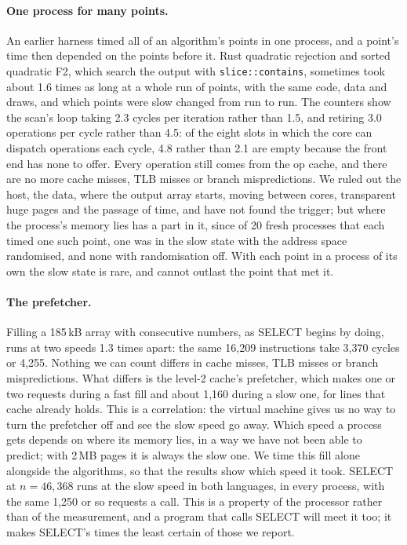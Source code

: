 \documentclass[letterpaper,11pt]{article}
\begin{document}
\paragraph{One process for many points.} An earlier harness timed all
of an algorithm's points in one process, and a point's time then
depended on the points before it. Rust quadratic rejection and sorted
quadratic F2, which search the output with
\texttt{slice::contains}, sometimes took about 1.6 times as
long at a whole run of points, with the same code, data and draws, and
which points were slow changed from run to run. The counters show the
scan's loop taking 2.3 cycles per iteration rather than 1.5, and
retiring 3.0 operations per cycle rather than 4.5: of the eight slots
in which the core can dispatch operations each cycle, 4.8 rather than
2.1 are empty because the front end has none to offer. Every operation
still comes from the op cache, and there are no more cache misses, TLB
misses or branch mispredictions. We ruled out the host, the data,
where the output array starts, moving between cores, transparent huge
pages and the passage of time, and have not found the trigger; but
where the process's memory lies has a part in it, since of 20 fresh
processes that each timed one such point, one was in the slow state
with the address space randomised, and none with randomisation off.
With each point in a process of its own the slow state is rare, and
cannot outlast the point that met it.

\paragraph{The prefetcher.} Filling a 185\,kB array with consecutive
numbers, as SELECT begins by doing, runs at two speeds 1.3 times apart:
the same 16,209 instructions take 3,370 cycles or 4,255. Nothing we can
count differs in cache misses, TLB misses or branch mispredictions. What
differs is the level-2 cache's prefetcher, which makes one or two
requests during a fast fill and about 1,160 during a slow one, for
lines that cache already holds. This is a correlation: the virtual
machine gives us no way to turn the prefetcher off and see the slow
speed go away. Which speed a process gets depends on where its memory
lies, in a way we have not been able to predict; with 2\,MB pages it is
always the slow one. We time this fill alone alongside the algorithms,
so that the results show which speed it took. SELECT at
\(n = 46{,}368\) runs at the slow speed in both languages, in every
process, with the same 1,250 or so requests a call. This is a property
of the processor rather than of the measurement, and a program that
calls SELECT will meet it too; it makes SELECT's times the least
certain of those we report.
\end{document}
